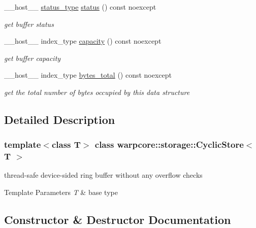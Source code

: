 \begin{DoxyCompactItemize}
\+\_\+\+\_\+host\+\_\+\+\_\+ \hyperlink{classwarpcore_1_1Status}{status\+\_\+type} \hyperlink{classwarpcore_1_1storage_1_1CyclicStore_ab6c224b2b5a49d93dc7e052ec7b8cc32}{status} () const noexcept
\begin{DoxyCompactList}\small\item\em get buffer status \end{DoxyCompactList}\item 
\+\_\+\+\_\+host\+\_\+\+\_\+ index\+\_\+type \hyperlink{classwarpcore_1_1storage_1_1CyclicStore_acc4bfbb9b10868a193301d0ec5a46711}{capacity} () const noexcept
\begin{DoxyCompactList}\small\item\em get buffer capacity \end{DoxyCompactList}\item 
\+\_\+\+\_\+host\+\_\+\+\_\+ index\+\_\+type \hyperlink{classwarpcore_1_1storage_1_1CyclicStore_ae65e099d0cfe170fc4cd2f02682c3bda}{bytes\+\_\+total} () const noexcept
\begin{DoxyCompactList}\small\item\em get the total number of bytes occupied by this data structure \end{DoxyCompactList}\end{DoxyCompactItemize}


\subsection{Detailed Description}
\subsubsection*{template$<$class T$>$\newline
class warpcore\+::storage\+::\+Cyclic\+Store$<$ T $>$}

thread-\/safe device-\/sided ring buffer without any overflow checks 


\begin{DoxyTemplParams}{Template Parameters}
{\em T} & base type \\
\hline
\end{DoxyTemplParams}


\subsection{Constructor \& Destructor Documentation}
\mbox{\label{classwarpcore_1_1storage_1_1CyclicStore_aca834b00d59e653c092db712ca7eb7a0}} 
